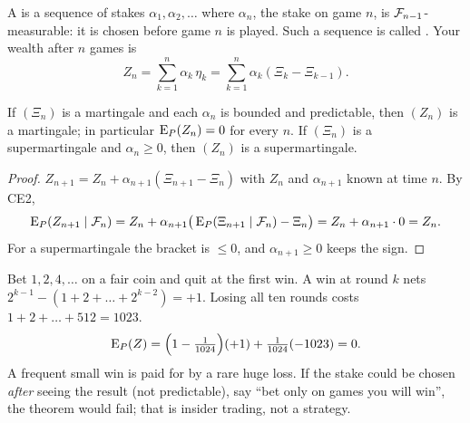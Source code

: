 \begin{definition}
A  is a sequence of stakes $\alpha_1,\alpha_2,\ldots$ where $\alpha_n$, the stake on game $n$, is $\mathcal F_{n-1}$-measurable: it is chosen before game $n$ is played. Such a sequence is called . Your wealth after $n$ games is
\[
  Z_n=\sum_{k=1}^n\alpha_k\,\eta_k=\sum_{k=1}^n\alpha_k(\Xi_k-\Xi_{k-1}).
\]
\end{definition}

\begin{theorem}
\label{thm:no-beat}
If $(\Xi_n)$ is a martingale and each $\alpha_n$ is bounded and predictable, then $(Z_n)$ is a martingale; in particular $\operatorname{E}_P(Z_n)=0$ for every $n$. If $(\Xi_n)$ is a supermartingale and $\alpha_n\ge0$, then $(Z_n)$ is a supermartingale.
\end{theorem}
\begin{proof}
$Z_{n+1}=Z_n+\alpha_{n+1}(\Xi_{n+1}-\Xi_n)$ with $Z_n$ and $\alpha_{n+1}$ known at time $n$. By CE2,
\[
  \operatorname{E}_P(Z_{n+1}\mid\mathcal F_n)=Z_n+\alpha_{n+1}\big(\operatorname{E}_P(\Xi_{n+1}\mid\mathcal F_n)-\Xi_n\big)=Z_n+\alpha_{n+1}\cdot0=Z_n .
\]
For a supermartingale the bracket is $\le0$, and $\alpha_{n+1}\ge0$ keeps the sign.
\end{proof}

\begin{example}
Bet $1,2,4,\dots$ on a fair coin and quit at the first win. A win at round $k$ nets $2^{k-1}-(1+2+\dots+2^{k-2})=+1$. Losing all ten rounds costs $1+2+\dots+512=1023$.
\[
  \operatorname{E}_P(Z)=\Big(1-\tfrac{1}{1024}\Big)(+1)+\tfrac{1}{1024}(-1023)=0 .
\]
A frequent small win is paid for by a rare huge loss. If the stake could be chosen \emph{after} seeing the result (not predictable), say ``bet only on games you will win'', the theorem would fail; that is insider trading, not a strategy.
\end{example}


